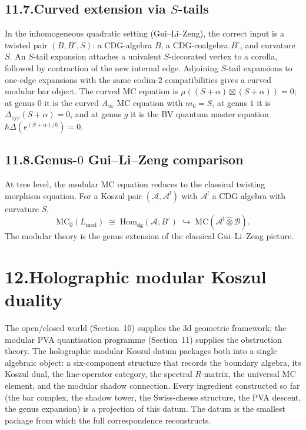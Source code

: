 \documentclass[11pt,reqno]{amsart}
\theoremstyle{definition}
\theoremstyle{remark}
\providecommand{\cA}{\mathcal{A}}
\providecommand{\cB}{\mathcal{B}}
\providecommand{\MC}{\mathrm{MC}}
\providecommand{\Hom}{\mathrm{Hom}}
\providecommand{\mod}{\mathrm{mod}}
\numberwithin{equation}{section}
\begin{document}
\subsection*{11.7.\enspace Curved extension via $S$-tails}

In the inhomogeneous quadratic setting (Gui--Li--Zeng), the
correct input is a twisted pair $(B, B^\circ, S)$: a
CDG-algebra $B$, a CDG-coalgebra $B^\circ$, and curvature $S$.
An $S$-tail expansion attaches a univalent $S$-decorated vertex
to a corolla, followed by contraction of the new internal edge.
Adjoining $S$-tail expansions to one-edge expansions with the
same codim-$2$ compatibilities gives a curved modular bar
object. The curved MC equation is
$\mu((S + \alpha) \boxtimes (S + \alpha)) = 0$; at genus $0$
it is the curved $A_\infty$ MC equation with $m_0 = S$, at
genus $1$ it is $\Delta_{\mathrm{cyc}}(S + \alpha) = 0$, and
at genus $g$ it is the BV quantum master equation
$\hbar\Delta(e^{(S+\alpha)/\hbar}) = 0$.

\subsection*{11.8.\enspace Genus-$0$ Gui--Li--Zeng comparison}

At tree level, the modular MC equation reduces to the
classical twisting morphism equation. For a Koszul pair
$(\cA, \cA^!)$ with $\cA^!$ a CDG algebra with curvature $S$,
\[
\MC_0(L_{\mod})
\;\cong\;
\Hom_{\mathsf{dg}}(\cA, B^\circ)
\;\hookrightarrow\;
\MC(\cA^! \widehat\otimes \cB).
\]
The modular theory is the genus extension of the classical
Gui--Li--Zeng picture.


\section*{12.\quad Holographic modular Koszul duality}

The open/closed world (Section~10) supplies the 3d geometric
framework; the modular PVA quantisation programme
(Section~11) supplies the obstruction theory. The holographic
modular Koszul datum packages both into a single algebraic
object: a six-component structure that records the boundary
algebra, its Koszul dual, the line-operator category, the
spectral $R$-matrix, the universal MC element, and the modular
shadow connection. Every ingredient constructed so far (the
bar complex, the shadow tower, the Swiss-cheese structure, the
PVA descent, the genus expansion) is a projection of this
datum. The datum is the smallest package from which the full
correspondence reconstructs.
\end{document}
